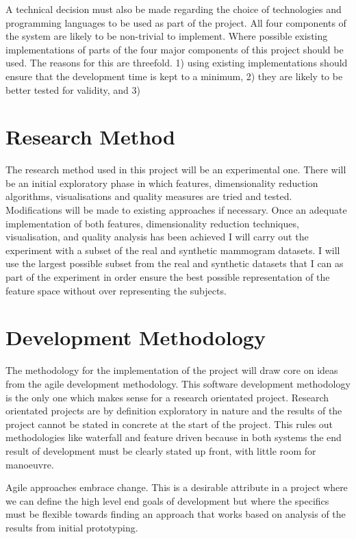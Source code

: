 A technical decision must also be made regarding the choice of technologies and programming languages to be used as part of the project. All four components of the system are likely to be non-trivial to implement. Where possible existing implementations of parts of the four major components of this project should be used. The reasons for this are threefold. 1) using existing implementations should ensure that the development time is kept to a minimum, 2) they are likely to be better tested for validity, and 3)  

\section{Research Method}
The research method used in this project will be an experimental one. There will be an initial exploratory phase in which features, dimensionality reduction algorithms, visualisations and quality measures are tried and tested. Modifications will be made to existing approaches if necessary. Once an adequate implementation of both features, dimensionality reduction techniques, visualisation, and quality analysis has been achieved I will carry out the experiment with a subset of the real and synthetic mammogram datasets. I will use the largest possible subset from the real and synthetic datasets that I can as part of the experiment in order ensure the best possible representation of the feature space without over representing the subjects.

\section{Development Methodology}
The methodology for the implementation of the project will draw core on ideas from the agile development methodology. This software development methodology is the only one which makes sense for a research orientated project. Research orientated projects are by definition exploratory in nature and the results of the project cannot be stated in concrete at the start of the project. This rules out methodologies like waterfall and feature driven because in both systems the end result of development must be clearly stated up front, with little room for manoeuvre.

Agile approaches embrace change. This is a desirable attribute in a project where we can define the high level end goals of development but where the specifics must be flexible towards finding an approach that works based on analysis of the results from initial prototyping.


